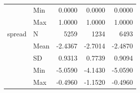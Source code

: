 \documentclass[10pt]{article}
\begin{document}
\begin{longtable}{l l r r r}
                & Min   &     0.0000 &     0.0000 &     0.0000\\
                & Max   &     1.0000 &     1.0000 &     1.0000\\
\addlinespace
spread          & N     &       5259 &       1234 &       6493\\
                & Mean  &    -2.4367 &    -2.7014 &    -2.4870\\
                & SD    &     0.9313 &     0.7739 &     0.9094\\
                & Min   &    -5.0590 &    -4.1430 &    -5.0590\\
                & Max   &    -0.4960 &    -1.1520 &    -0.4960\\
\end{longtable}
\end{document}
